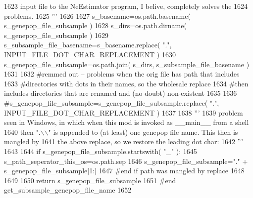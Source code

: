 \begin{DoxyCode}
1623 \textcolor{stringliteral}{    input file to the NeEstimator program, I belive, completely solves the}
1624 \textcolor{stringliteral}{    problems.}
1625 \textcolor{stringliteral}{    '''}
1626 
1627     s\_basename=os.path.basename( s\_genepop\_file\_subsample )
1628     s\_dirs=os.path.dirname( s\_genepop\_file\_subsample )
1629     s\_subsample\_file\_basename=s\_basename.replace( \textcolor{stringliteral}{"."}, INPUT\_FILE\_DOT\_CHAR\_REPLACEMENT )
1630     s\_genepop\_file\_subsample=os.path.join( s\_dirs, s\_subsample\_file\_basename )
1631     
1632     \textcolor{comment}{#remmed out -- problems when the orig file has path that includes }
1633     \textcolor{comment}{#directories with dots in their names, so the wholesale replace}
1634     \textcolor{comment}{#then includes directories that are renamed and (no doubt) non-existent}
1635 
1636     \textcolor{comment}{#s\_genepop\_file\_subsample=s\_genepop\_file\_subsample.replace( ".", INPUT\_FILE\_DOT\_CHAR\_REPLACEMENT )}
1637     
1638     \textcolor{stringliteral}{'''}
1639 \textcolor{stringliteral}{    problem seen in Windows, in which when this mod is invoked as \_\_main\_\_ from a shell}
1640 \textcolor{stringliteral}{    then ".\(\backslash\)\(\backslash\)" is appended to (at least) one genepop file name.  This then is mangled by}
1641 \textcolor{stringliteral}{    the above replace, so we restore the leading dot char:}
1642 \textcolor{stringliteral}{    '''}
1643 
1644     \textcolor{keywordflow}{if} s\_genepop\_file\_subsample.startswith(  \textcolor{stringliteral}{"\_"} ):
1645         s\_path\_seperator\_this\_os=os.path.sep
1646         s\_genepop\_file\_subsample=\textcolor{stringliteral}{"."} + s\_genepop\_file\_subsample[1:] 
1647     \textcolor{comment}{#end if path was mangled by replace}
1648 
1649 
1650     \textcolor{keywordflow}{return} s\_genepop\_file\_subsample
1651 \textcolor{comment}{#end get\_subsample\_genepop\_file\_name}
1652 
\end{DoxyCode}
